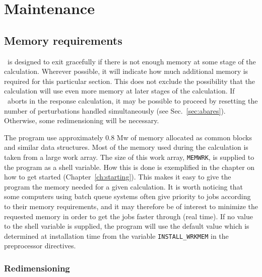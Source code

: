 \chapter{Maintenance}\label{ch:maintain}

\section{Memory requirements}

\siraba\ is designed to exit gracefully if there is not enough
memory at some stage of the calculation.  Wherever possible, it
will indicate how much additional memory is required for this
particular section.  This does not exclude the possibility that
the calculation will use even more memory at later stages of the
calculation. If \siraba\ aborts in the response calculation, it
may be possible to proceed by resetting the number of
perturbations handled simultaneously (see 
Sec.~\ref{sec:abares}).  Otherwise, some redimensioning will be
necessary.

The program use approximately 0.8 Mw of memory allocated as common
blocks and similar data structures. Most of the memory used during the
calculation is taken from a large work array. The size of this work
array,
\verb|MEMWRK|, is supplied to the program as a shell
variable. How this is done is
exemplified in the chapter on how to get started
(Chapter~\ref{ch:starting}). This makes it easy
to give the program the memory needed for a given calculation. It is
worth noticing that some computers using batch queue systems often
give priority to jobs according to their memory requirements, and it may
therefore be of interest to minimize the requested memory in order to
get the jobs faster through (real time). If no value to the shell
variable is supplied, the program will use the  default value which is
determined at installation time from the variable
\verb|INSTALL_WRKMEM| in the preprocessor
directives.

\subsection{Redimensioning  \siraba}

